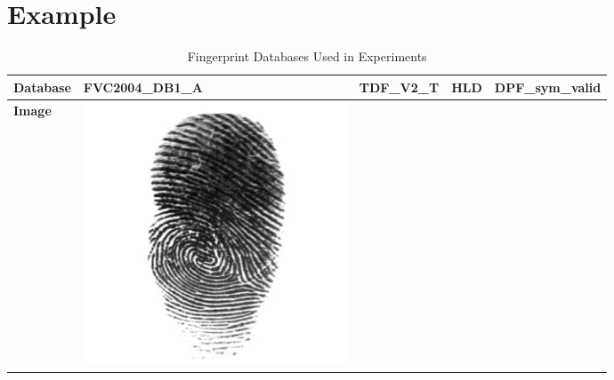 \documentclass[journal]{IEEEtran}
\begin{document}
\section{Example}
\begin{table}[!t]
	\caption{Fingerprint Databases Used in Experiments\label{tab:database}}
	\centering
	\renewcommand{\arraystretch}{1.4}
	\begin{tabular}{| m{1.5cm}<{\centering} | m{3.7cm}<{\centering} | m{3.7cm}<{\centering} | m{3.7cm}<{\centering} | m{3.7cm}<{\centering} |}
		\hline
		\textbf{Database} & FVC2004\_DB1\_A & TDF\_V2\_T & HLD & DPF\_sym\_valid \\
		\hline
		\quad\newline\quad\newline\quad\newline\textbf{Image} 
		& \begin{minipage}[][20mm][c]{.1\textwidth}\centering
			\includegraphics[width=\linewidth]{images/db_ex_1.pdf}
		\end{minipage}
		& \begin{minipage}[][20mm][c]{.1\textwidth}\centering

\end{minipage}
\end{tabular}
\end{table}
\end{document}
